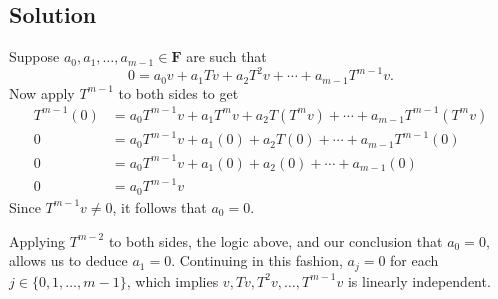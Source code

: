 \documentclass{article}
\begin{document}
\subsection*{Solution}
Suppose $a_0,a_1,\ldots,a_{m-1}\in\mathbf{F}$ are such that 
\[0=a_0v+a_1Tv+a_2T^2v+\cdots+a_{m-1}T^{m-1}v.\]
Now apply $T^{m-1}$ to both sides to get
\begin{align*}
    T^{m-1}(0)&=a_0T^{m-1}v+a_1T^mv+a_2T(T^mv)+\cdots+a_{m-1}T^{m-1}(T^mv)\\
    0&=a_0T^{m-1}v+a_1(0)+a_2T(0)+\cdots+a_{m-1}T^{m-1}(0)\\
    0&=a_0T^{m-1}v+a_1(0)+a_2(0)+\cdots+a_{m-1}(0)\\
    0&=a_0T^{m-1}v
\end{align*}
Since $T^{m-1}v\neq 0$, it follows that $a_0=0$.

Applying $T^{m-2}$ to both sides, the logic above, and our conclusion that $a_0=0$, allows us to deduce $a_1=0$. Continuing in this fashion, $a_j=0$ for each $j\in\{0,1,\ldots,m-1\}$, which implies $v,Tv,T^2v,\ldots,T^{m-1}v$ is linearly independent.
\end{document}
